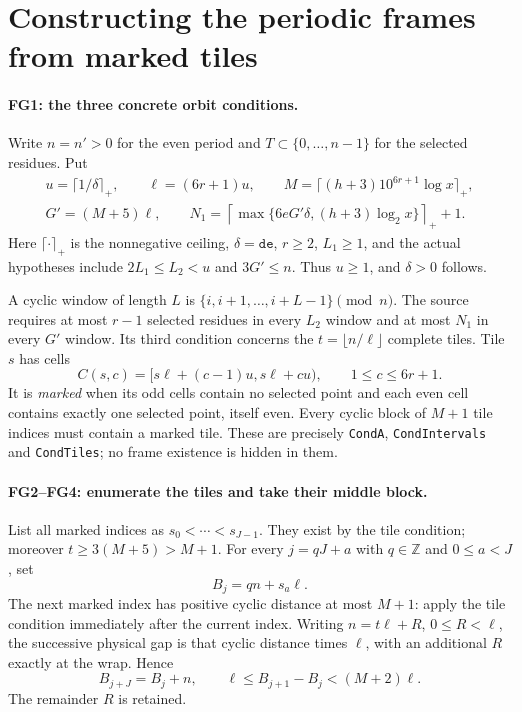 \section{Constructing the periodic frames from marked tiles}
\label{sec:frame-geometry}


\paragraph{FG1: the three concrete orbit conditions.}
Write $n=n'>0$ for the even period and
$T\subset\{0,\ldots,n-1\}$ for the selected residues. Put
\[
\begin{gathered}
 u=\lceil1/\delta\rceil_+,\qquad \ell=(6r+1)u,\qquad
 M=\lceil(h+3)10^{6r+1}\log x\rceil_+,\\
 G'=(M+5)\ell,\qquad
 N_1=\left\lceil\max\{6eG'\delta,(h+3)\log_2x\}\right\rceil_++1 .
\end{gathered}                                                    \tag{FG.1}
\]
Here $\lceil\cdot\rceil_+$ is the nonnegative ceiling, $\delta=\texttt{de}$,
$r\ge2$, $L_1\ge1$, and the actual hypotheses include
$2L_1\le L_2<u$ and $3G'\le n$. Thus $u\ge1$, and $\delta>0$ follows.

A cyclic window of length $L$ is
$\{i,i+1,\ldots,i+L-1\}\pmod n$. The source requires at most $r-1$
selected residues in every $L_2$ window and at most $N_1$ in every $G'$
window. Its third condition concerns the $t=\lfloor n/\ell\rfloor$
complete tiles. Tile $s$ has cells
\[
 C(s,c)=[s\ell+(c-1)u,s\ell+cu),\qquad 1\le c\le6r+1.
\]
It is \emph{marked} when its odd cells contain no selected point and
each even cell contains exactly one selected point, itself even.
Every cyclic block of $M+1$ tile indices must contain a marked tile.
These are precisely \texttt{CondA}, \texttt{CondIntervals} and
\texttt{CondTiles}; no frame existence is hidden in them.

\paragraph{FG2--FG4: enumerate the tiles and take their middle block.}
List all marked indices as $s_0<\cdots<s_{J-1}$.
They exist by the tile condition; moreover $t\ge3(M+5)>M+1$.
For every $j=qJ+a$ with $q\in\mathbb Z$ and $0\le a<J$, set
\[
 B_j=qn+s_a\ell.
\]
The next marked index has positive cyclic distance at most $M+1$:
apply the tile condition immediately after the current index.
Writing $n=t\ell+R$, $0\le R<\ell$, the successive physical gap is
that cyclic distance times $\ell$, with an additional $R$ exactly
at the wrap. Hence
\[
 B_{j+J}=B_j+n,\qquad
 \ell\le B_{j+1}-B_j<(M+2)\ell.                         \tag{FG.2}
\]
The remainder $R$ is retained.

